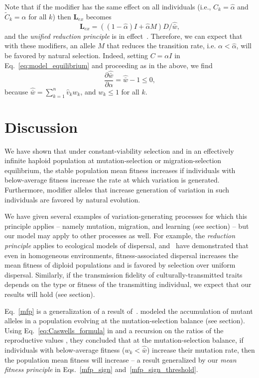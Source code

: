 \documentclass[9pt, a4paper, twocolumn]{extarticle}
\newcommand{\cl}{\mathbf{L}}
\begin{document}
Note that if the modifier has the same effect on all individuals (i.e., $C_k = \hat\alpha$ and $\tilde{C}_k = \alpha$ for all $k$) then $\cl_{ex}$ becomes
\begin{equation}
\cl_{ex} = ((1 - \hat\alpha)I + \hat\alpha M) D /\hat{\bar w},
\end{equation}  
and the \emph{unified reduction principle} is in effect~\cite[eqs. 65, 72]{Altenberg2017}.
Therefore, we can expect that with these modifiers, an allele $M$ that reduces the transition rate, i.e. $\alpha < \hat\alpha$, will be favored by natural selection.
Indeed, setting $C = \alpha I$ in Eq.~\ref{eq:model_equilibrium} and proceeding as in the above, we find
$$
\frac{\partial \hat{\bar w}}{\partial \alpha} = 
\hat{\bar w} - 1 \le 0,
$$
because $\hat{\bar w} = \sum_{k=1}^{n}{\hat v_k w_k}$, and $w_k \le 1$ for all $k$.


\section*{Discussion}

We have shown that under constant-viability selection and in an effectively infinite haploid population at mutation-selection or migration-selection equilibrium, the stable population mean fitness increases if individuals with below-average fitness increase the rate at which variation is generated. Furthermore, modifier alleles that  increase generation of variation in such individuals are favored by natural evolution.

We have given several examples of variation-generating processes for which this principle applies -- namely mutation, migration, and learning (see \emph{} section) -- but our model may apply to other processes as well.
For example, the \emph{reduction principle} applies to ecological models of dispersal, and~\citet{Gueijman2013} have demonstrated that even in homogeneous environments, fitness-associated dispersal increases the mean fitness of diploid populations and is favored by selection over uniform dispersal.
Similarly, if the transmission fidelity of culturally-transmitted traits depends on the type or fitness of the transmitting individual, we expect that our results will hold (see \emph{} section).

Eq.~\ref{mfp} is a generalization of a result of~\citet[Eq.~4]{Ram2012}.
\citeauthor{Ram2012} modeled the accumulation of mutant alleles in a population evolving at the mutation-selection balance (see \emph{} section).
Using Eq.~\ref{eq:Caswells_formula} in  and a recursion on the ratios of the reproductive values \cite[see][eqs.~A5-6]{Ram2012}, they concluded that at the mutation-selection balance, if individuals with below-average fitness ($w_k < \hat{\bar w}$) increase their mutation rate, then the population mean fitness will increase -- a result generalized by our \emph{mean fitness principle} in Eqs.~\ref{mfp_sign} and~\ref{mfp_sign_threshold}.
\end{document}
